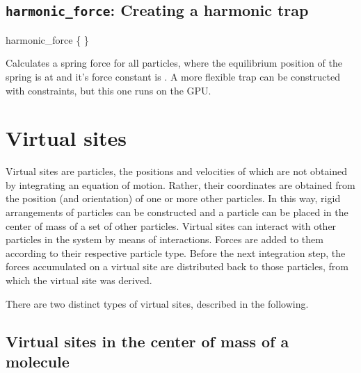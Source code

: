 \subsection{\texttt{harmonic_force}: Creating a harmonic trap}
 \begin{essyntax}
   harmonic_force \{    \} 
  \begin{features}
  \end{features}
 \end{essyntax}

 Calculates a spring force for all particles, where the equilibrium position
 of the spring is at  and it's force constant is . A more
 flexible trap can be constructed with constraints, but this one runs on the GPU.

\section{Virtual sites}
\label{sec:virtual}

Virtual sites are particles, the positions and velocities of which are
not obtained by integrating an equation of motion.  Rather, their
coordinates are obtained from the position (and orientation) of one or
more other particles. In this way, rigid arrangements of particles can
be constructed and a particle can be placed in the center of mass of a
set of other particles.  Virtual sites can interact with other
particles in the system by means of interactions. Forces are added to
them according to their respective particle type. Before the next
integration step, the forces accumulated on a virtual site are
distributed back to those particles, from which the virtual site was
derived.

There are two distinct types of virtual sites, described in the
following.

\subsection{Virtual sites in the center of mass of a molecule}

